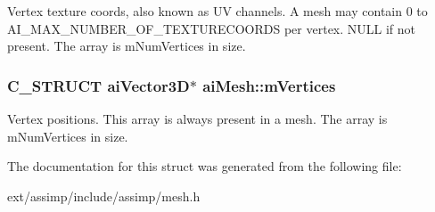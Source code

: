 Vertex texture coords, also known as U\-V channels. A mesh may contain 0 to A\-I\-\_\-\-M\-A\-X\-\_\-\-N\-U\-M\-B\-E\-R\-\_\-\-O\-F\-\_\-\-T\-E\-X\-T\-U\-R\-E\-C\-O\-O\-R\-D\-S per vertex. N\-U\-L\-L if not present. The array is m\-Num\-Vertices in size. \hypertarget{structai_mesh_afd4588abb3e1c72821ae0234a3850662}{
\subsubsection[{m\-Vertices}]{\setlength{\rightskip}{0pt plus 5cm}C\-\_\-\-S\-T\-R\-U\-C\-T {\bf ai\-Vector3\-D}$\ast$ ai\-Mesh\-::m\-Vertices}}\label{structai_mesh_afd4588abb3e1c72821ae0234a3850662}
Vertex positions. This array is always present in a mesh. The array is m\-Num\-Vertices in size. 

The documentation for this struct was generated from the following file\-:\begin{DoxyCompactItemize}
\item 
ext/assimp/include/assimp/mesh.\-h\end{DoxyCompactItemize}
